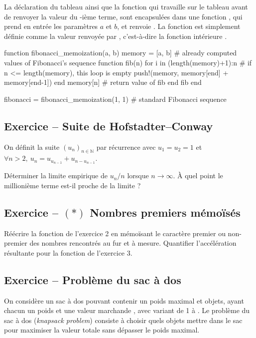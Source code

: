 \documentclass{article}
\newcounter{loop}
\newcounter{numEx}
\newcommand{\exo}[1]{
	\stepcounter{numEx}
	\setcounter{loop}{0}
	\subsection*{Exercice \arabic{numEx} -- #1}
}
\newcommand{\seq}[3]{\ensuremath{\left(#1_{#2}\right)_{#2\in#3}}}
\newcommand{\N}{\mathbb{N}}
\newenvironment{repl}{\vspace{-0.6em}\VerbatimEnvironment\begin{jlrepl}}{\end{jlrepl}}
\begin{document}
La déclaration du tableau  ainsi que la fonction  qui travaille sur le tableau avant de renvoyer la valeur du -ième terme, sont encapsulées dans une fonction , qui prend en entrée les paramètres $a$ et $b$, et renvoie . La fonction  est simplement définie comme la valeur renvoyée par , c'est-à-dire la fonction intérieure .\vspace{0.5em}

\begin{repl}
function fibonacci_memoization(a, b)
    memory = [a, b] # already computed values of Fibonacci's sequence
    function fib(n)
        for i in (length(memory)+1):n # if n <= length(memory), this loop is empty
            push!(memory, memory[end] + memory[end-1])
        end
        memory[n] # return value of fib
    end
    fib
end

fibonacci = fibonacci_memoization(1, 1) # standard Fibonacci sequence
\end{repl}

\exo{Suite de Hofstadter--Conway}

On définit la suite $\seq un\N$ par récurrence avec $u_1 = u_2 = 1$ et $\forall n>2,\ u_n = u_{u_{n-1}} + u_{n - u_{n-1}}$.

Déterminer la limite empirique de $u_n/n$ lorsque $n\to\infty$. À quel point le millionième terme est-il proche de la limite ?

\exo{$(*)$ Nombres premiers mémoïsés}

Réécrire la fonction  de l'exercice 2 en mémoïsant le caractère premier ou non-premier des nombres rencontrés au fur et à mesure. Quantifier l'accélération résultante pour la fonction  de l'exercice 3.

\exo{Problème du sac à dos}

On considère un sac à dos pouvant contenir un poids maximal  et  objets, ayant chacun un poids  et une valeur marchande , avec  variant de 1 à .
Le problème du sac à dos (\textit{knapsack problem}) consiste à choisir quels objets mettre dans le sac pour maximiser la valeur totale sans dépasser le poids maximal.
\end{document}

